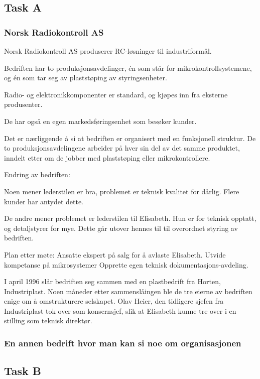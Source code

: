 
\subsection{Task A}

\subsubsection{Norsk Radiokontroll AS}


Norsk Radiokontroll AS produserer RC-løsninger til industriformål.

Bedriften har to produksjonsavdelinger, én som står for mikrokontrollsystemene, og én som tar seg av plaststøping av styringsenheter.

Radio- og elektronikkomponenter er standard, og kjøpes inn fra eksterne produsenter.

De har også en egen markedsføringsenhet som besøker kunder.

Det er nærliggende å si at bedriften er organisert med en funksjonell struktur.
De to produksjonsavdelingene arbeider på hver sin del av det samme produktet, inndelt etter om de jobber med plaststøping eller mikrokontrollere.

Endring av bedriften:

Noen mener lederstilen er bra, problemet er teknisk kvalitet for dårlig.
Flere kunder har antydet dette.

De andre mener problemet er lederstilen til Elisabeth.
Hun er for teknisk opptatt, og detaljstyrer for mye.
Dette går utover hennes til til overordnet styring av bedriften.

Plan etter møte:
Ansatte ekspert på salg for å avlaste Elisabeth.
Utvide kompetanse på mikrosystemer
Opprette egen teknisk dokumentasjons-avdeling.

I april 1996 slår bedriften seg sammen med en plastbedrift fra Horten, Industriplast.
Noen måneder etter sammenslåingen ble de tre eierne av bedriften enige om å omstrukturere selskapet. Olav Heier, den tidligere sjefen fra Industriplast tok over som konsernsjef, slik at Elisabeth kunne tre over i en stilling som teknisk direktør.


\subsubsection{En annen bedrift hvor man kan si noe om organisasjonen}

\subsection{Task B}

